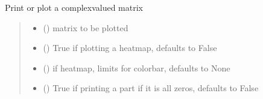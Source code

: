 \documentclass[letterpaper,10pt,english]{sphinxmanual}
\begin{document}

\begin{fulllineitems}
\label{\detokenize{spinbox:spinbox.extras.pmat}}
\pysigstartsignatures
{}
\pysigstopsignatures
\sphinxAtStartPar
Print or plot a complex\sphinxhyphen{}valued matrix
\begin{quote}\begin{description}
\begin{itemize}
\item {} 
\sphinxAtStartPar
{} () \textendash{} matrix to be plotted

\item {} 
\sphinxAtStartPar
{} (\sphinxstyleliteralemphasis{\sphinxupquote{, }}) \textendash{} True if plotting a heatmap, defaults to False

\item {} 
\sphinxAtStartPar
{} (\sphinxstyleliteralemphasis{\sphinxupquote{, }}) \textendash{} if heatmap, limits for colorbar, defaults to None

\item {} 
\sphinxAtStartPar
{} (\sphinxstyleliteralemphasis{\sphinxupquote{, }}) \textendash{} True if printing a part if it is all zeros, defaults to False

\end{itemize}

\end{description}\end{quote}

\end{fulllineitems}
\end{document}
